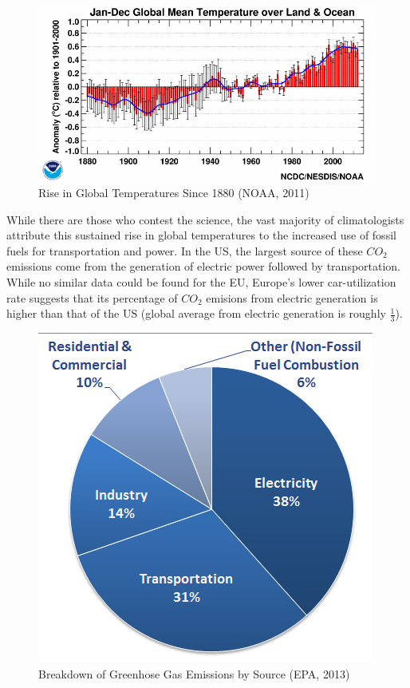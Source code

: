 \documentclass{article}
\begin{document}
\begin{figure}[H]
	\begin{center}
	\includegraphics[scale = .5]{Figures/meantemp.png}
	\caption{Rise in Global Temperatures Since 1880 (NOAA, 2011)}
	\end{center}
\end{figure}

While there are those who contest the science, the vast majority of climatologists attribute this sustained rise in global temperatures to the increased use of fossil fuels for transportation and power. In the US, the largest source of these $CO_{2}$ emissions come from the generation of electric power followed by transportation. While no similar data could be found for the EU, Europe's lower car-utilization rate suggests that its percentage of $CO_{2}$ emisions from electric generation is higher than that of the US (global average from electric generation is roughly $\frac{1}{3}$).

\begin{figure}[H]
	\begin{center}
	\includegraphics[scale = .5]{Figures/gases-co2.png}
	\caption{Breakdown of Greenhose Gas Emissions by Source (EPA, 2013)}
	\end{center}
\end{figure}
\end{document}
